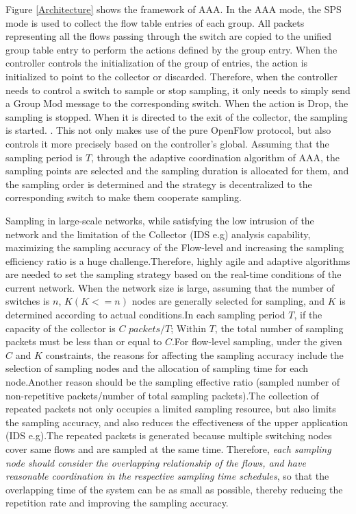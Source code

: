 \documentclass[conference,compsoc]{IEEEtran}
\begin{document}
Figure \ref{Architecture} shows the framework of AAA. In the AAA mode, the SPS mode is used to collect the flow table entries of each group. All packets representing all the flows passing through the switch are copied to the unified group table entry to perform the actions defined by the group entry. When the controller controls the initialization of the group of entries, the action is initialized to point to the collector or discarded. Therefore, when the controller needs to control a switch to sample or stop sampling, it only needs to simply send a Group Mod message to the corresponding switch. When the action is Drop, the sampling is stopped. When it is directed to the exit of the collector, the sampling is started. . This not only makes use of the pure OpenFlow protocol, but also controls it more precisely based on the controller's global. Assuming that the sampling period is $T$, through the adaptive coordination algorithm of AAA, the sampling points are selected and the sampling duration is allocated for them, and the sampling order is determined and the strategy is decentralized to the corresponding switch to make them cooperate sampling.

Sampling in large-scale networks, while satisfying the low intrusion of the network and the limitation of the Collector (IDS e.g) analysis capability, maximizing the sampling accuracy of the Flow-level and increasing the sampling efficiency ratio is a huge challenge.Therefore, highly agile and adaptive algorithms are needed to set the sampling strategy based on the real-time conditions of the current network. When the network size is large, assuming that the number of switches is $n$, $K(K<=n)$ nodes are generally selected for sampling, and $K$ is determined according to actual conditions.In each sampling period $T$, if the capacity of the collector is $C$ $packets/T$; Within $T$, the total number of sampling packets must be less than or equal to $C$.For flow-level sampling, under the given $C$ and $K$ constraints, the reasons for affecting the sampling accuracy include the selection of sampling nodes and the allocation of sampling time for each node.Another reason should be the sampling effective ratio (sampled number of non-repetitive packets/number of total sampling packets).The collection of repeated packets not only occupies a limited sampling resource, but also limits the sampling accuracy, and also reduces the effectiveness of the upper application (IDS e.g).The repeated packets is generated because multiple switching nodes cover same flows and are sampled at the same time. Therefore, \textit{each sampling node should consider the overlapping relationship of the flows, and have reasonable coordination in the respective sampling time schedules}, so that the overlapping time of the system can be as small as possible, thereby reducing the repetition rate and improving the sampling accuracy.
\end{document}

